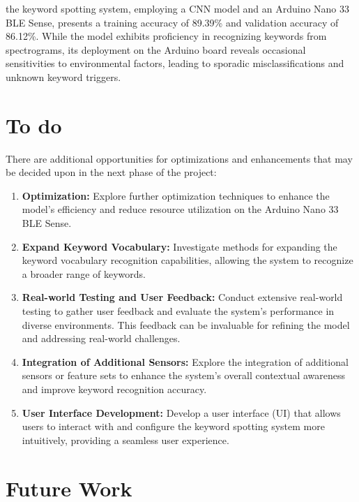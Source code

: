 the keyword spotting system, employing a CNN model and an Arduino Nano 33 BLE Sense, presents a training accuracy of 89.39\% and validation accuracy of 86.12\%. While the model exhibits proficiency in recognizing keywords from spectrograms, its deployment on the Arduino board reveals occasional sensitivities to environmental factors, leading to sporadic misclassifications and unknown keyword triggers. 

\section{To do}

There are additional opportunities for optimizations and enhancements that may be decided upon in the next phase of the project:

\begin{enumerate}
	\item \textbf{Optimization:} Explore further optimization techniques to enhance the model's efficiency and reduce resource utilization on the Arduino Nano 33 BLE Sense.
	
	\item \textbf{Expand Keyword Vocabulary:} Investigate methods for expanding the keyword vocabulary recognition capabilities, allowing the system to recognize a broader range of keywords.
	
	\item \textbf{Real-world Testing and User Feedback:} Conduct extensive real-world testing to gather user feedback and evaluate the system's performance in diverse environments. This feedback can be invaluable for refining the model and addressing real-world challenges.
	
	\item \textbf{Integration of Additional Sensors:} Explore the integration of additional sensors or feature sets to enhance the system's overall contextual awareness and improve keyword recognition accuracy.
	
	\item \textbf{User Interface Development:} Develop a user interface (UI) that allows users to interact with and configure the keyword spotting system more intuitively, providing a seamless user experience.
\end{enumerate}


\section{Future Work}

